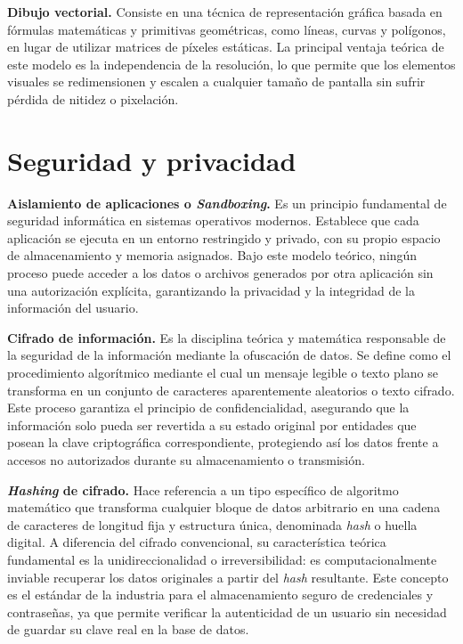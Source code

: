 \textbf{Dibujo vectorial.} Consiste en una técnica de representación gráfica basada en fórmulas matemáticas y primitivas geométricas, como líneas, curvas y polígonos, en lugar de utilizar matrices de píxeles estáticas. La principal ventaja teórica de este modelo es la independencia de la resolución, lo que permite que los elementos visuales se redimensionen y escalen a cualquier tamaño de pantalla sin sufrir pérdida de nitidez o pixelación.

\section{Seguridad y privacidad}

\textbf{Aislamiento de aplicaciones o \textit{Sandboxing}.} Es un principio fundamental de seguridad informática en sistemas operativos modernos. Establece que cada aplicación se ejecuta en un entorno restringido y privado, con su propio espacio de almacenamiento y memoria asignados. Bajo este modelo teórico, ningún proceso puede acceder a los datos o archivos generados por otra aplicación sin una autorización explícita, garantizando la privacidad y la integridad de la información del usuario.  \cite{esed_sandboxing}

\textbf{Cifrado de información.} Es la disciplina teórica y matemática responsable de la seguridad de la información mediante la ofuscación de datos. Se define como el procedimiento algorítmico mediante el cual un mensaje legible o texto plano se transforma en un conjunto de caracteres aparentemente aleatorios o texto cifrado. Este proceso garantiza el principio de confidencialidad, asegurando que la información solo pueda ser revertida a su estado original por entidades que posean la clave criptográfica correspondiente, protegiendo así los datos frente a accesos no autorizados durante su almacenamiento o transmisión.

\textbf{\textit{Hashing} de cifrado.} Hace referencia a un tipo específico de algoritmo matemático que transforma cualquier bloque de datos arbitrario en una cadena de caracteres de longitud fija y estructura única, denominada \textit{hash} o huella digital. A diferencia del cifrado convencional, su característica teórica fundamental es la unidireccionalidad o irreversibilidad: es computacionalmente inviable recuperar los datos originales a partir del \textit{hash} resultante. Este concepto es el estándar de la industria para el almacenamiento seguro de credenciales y contraseñas, ya que permite verificar la autenticidad de un usuario sin necesidad de guardar su clave real en la base de datos. 
